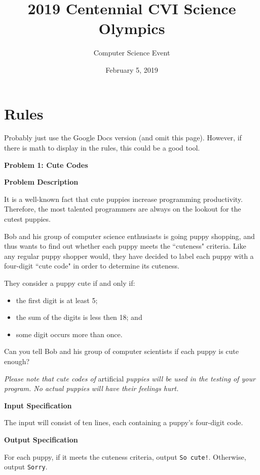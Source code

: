 \documentclass[11pt]{article}
\title{2019 Centennial CVI Science Olympics}
\author{Computer Science Event}
\date{February 5, 2019}
\newcommand{\problem}[2]{\textbf{\Large Problem #1: #2} \vspace{0.4em}}
\newcommand{\heading}[1]{\vspace{0.6em} \textbf{#1}}
\begin{document}
\maketitle

\section{Rules}

Probably just use the Google Docs version (and omit this page). However, if there is math to display in the rules, this could be a good tool.

\pagebreak



\problem{1}{Cute Codes}


\heading{Problem Description}

It is a well-known fact that cute puppies increase programming productivity. Therefore, the most talented programmers are always on the lookout for the cutest puppies.

Bob and his group of computer science enthusiasts is going puppy shopping, and thus wants to find out whether each puppy meets the ``cuteness" criteria. Like any regular puppy shopper would, they have decided to label each puppy with a four-digit ``cute code" in order to determine its cuteness.

They consider a puppy cute if and only if:
\begin{itemize}
    \item the first digit is at least 5;
    \item the sum of the digits is less then 18; and
    \item some digit occurs more than once.
\end{itemize}

Can you tell Bob and his group of computer scientists if each puppy is cute enough?

\textit{Please note that cute codes of} artificial \textit{puppies will be used in the testing of your program. No actual puppies will have their feelings hurt.}


\heading{Input Specification}

The input will consist of ten lines, each containing a puppy's four-digit code.


\heading{Output Specification}

For each puppy, if it meets the cuteness criteria, output \verb|So cute!|. Otherwise, output \verb|Sorry|.
\end{document}
